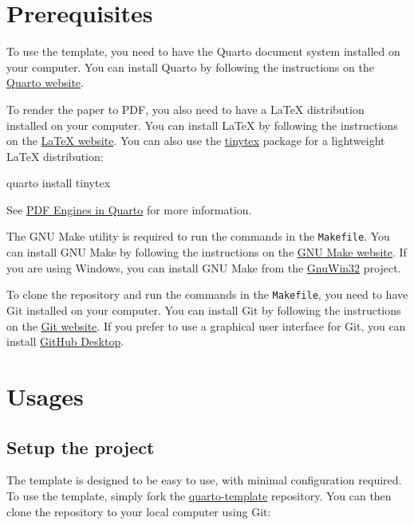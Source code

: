 \documentclass[
  authoryear,
  review,
  3p,
  onecolumn]{elsarticle}
\newenvironment{Shaded}{\begin{snugshade}}{\end{snugshade}}
\newcommand{\ExtensionTok}[1]{\textcolor[rgb]{0.00,0.23,0.31}{#1}}
\newcommand{\NormalTok}[1]{\textcolor[rgb]{0.00,0.23,0.31}{#1}}
\begin{document}
\section{Prerequisites}\label{prerequisites}

To use the template, you need to have the Quarto document system
installed on your computer. You can install Quarto by following the
instructions on the
\href{https://quarto.org/docs/getting-started/}{Quarto website}.

To render the paper to PDF, you also need to have a LaTeX distribution
installed on your computer. You can install LaTeX by following the
instructions on the \href{https://www.latex-project.org/get/}{LaTeX
website}. You can also use the
\href{https://yihui.org/tinytex/}{tinytex} package for a lightweight
LaTeX distribution:

\begin{Shaded}
\begin{Highlighting}[]
\ExtensionTok{quarto}\NormalTok{ install tinytex}
\end{Highlighting}
\end{Shaded}

See \href{https://quarto.org/docs/output-formats/pdf-engine.html}{PDF
Engines in Quarto} for more information.

The GNU Make utility is required to run the commands in the
\texttt{Makefile}. You can install GNU Make by following the
instructions on the \href{https://www.gnu.org/software/make/}{GNU Make
website}. If you are using Windows, you can install GNU Make from the
\href{http://gnuwin32.sourceforge.net/packages/make.htm}{GnuWin32}
project.

To clone the repository and run the commands in the \texttt{Makefile},
you need to have Git installed on your computer. You can install Git by
following the instructions on the \href{https://git-scm.com/}{Git
website}. If you prefer to use a graphical user interface for Git, you
can install \href{https://desktop.github.com/}{GitHub Desktop}.

\section{Usages}\label{usages}

\subsection{Setup the project}\label{setup-the-project}

The template is designed to be easy to use, with minimal configuration
required. To use the template, simply fork the
\href{https://github.com/haiiliin/quarto-template}{quarto-template}
repository. You can then clone the repository to your local computer
using Git:
\end{document}
